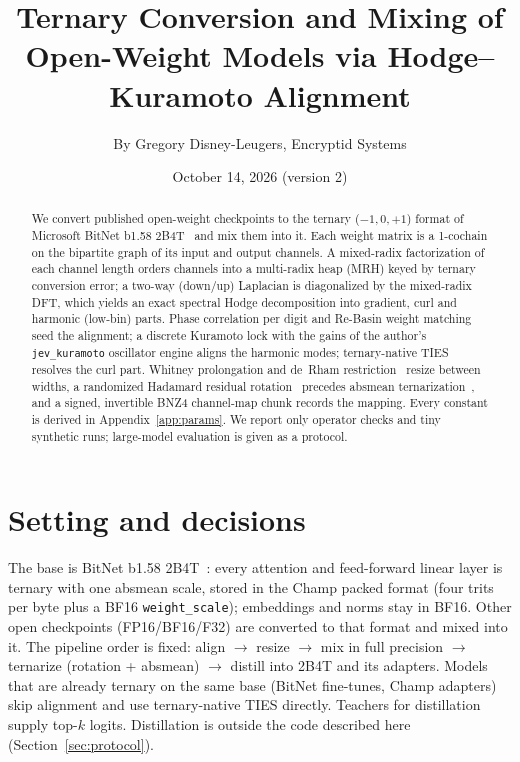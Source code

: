 \documentclass[11pt]{article}
\title{Ternary Conversion and Mixing of Open-Weight Models via Hodge--Kuramoto Alignment}
\author{By Gregory Disney-Leugers, Encryptid Systems}
\date{October 14, 2026 (version 2)}
\begin{document}
\maketitle
\begin{abstract}
We convert published open-weight checkpoints to the ternary ($-1,0,+1$) format of Microsoft BitNet b1.58 2B4T~\cite{bitnet2b4t} and mix them into it. Each weight matrix is a 1-cochain on the bipartite graph of its input and output channels. A mixed-radix factorization of each channel length orders channels into a multi-radix heap (MRH) keyed by ternary conversion error; a two-way (down/up) Laplacian is diagonalized by the mixed-radix DFT, which yields an exact spectral Hodge decomposition into gradient, curl and harmonic (low-bin) parts. Phase correlation per digit and Re-Basin weight matching~\cite{rebasin} seed the alignment; a discrete Kuramoto lock with the gains of the author's \texttt{jev\_kuramoto} oscillator engine aligns the harmonic modes; ternary-native TIES~\cite{ties} resolves the curl part. Whitney prolongation and de~Rham restriction~\cite{afw} resize between widths, a randomized Hadamard residual rotation~\cite{quarot,slicegpt} precedes absmean ternarization~\cite{bitnet158}, and a signed, invertible BNZ4 channel-map chunk records the mapping. Every constant is derived in Appendix~\ref{app:params}. We report only operator checks and tiny synthetic runs; large-model evaluation is given as a protocol.
\end{abstract}

\section{Setting and decisions}
The base is BitNet b1.58 2B4T~\cite{bitnet2b4t}: every attention and feed-forward linear layer is ternary with one absmean scale, stored in the Champ packed format (four trits per byte plus a BF16 \texttt{weight\_scale}); embeddings and norms stay in BF16. Other open checkpoints (FP16/BF16/F32) are converted to that format and mixed into it. The pipeline order is fixed:
align $\to$ resize $\to$ mix in full precision $\to$ ternarize (rotation + absmean) $\to$ distill into 2B4T and its adapters.
Models that are already ternary on the same base (BitNet fine-tunes, Champ adapters) skip alignment and use ternary-native TIES directly. Teachers for distillation supply top-$k$ logits. Distillation is outside the code described here (Section~\ref{sec:protocol}).
\end{document}
